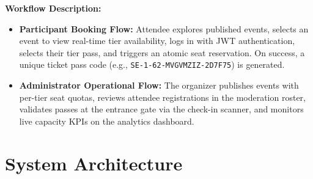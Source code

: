 \documentclass[11pt,a4paper]{article}
\begin{document}
\vspace{0.10in}
\noindent
\textbf{Workflow Description:}
\begin{itemize}[leftmargin=*]
    \item \textbf{Participant Booking Flow:} Attendee explores published events, selects an event to view real-time tier availability, logs in with JWT authentication, selects their tier pass, and triggers an atomic seat reservation. On success, a unique ticket pass code (e.g., \texttt{SE-1-62-MVGVMZIZ-2D7F75}) is generated.
    \item \textbf{Administrator Operational Flow:} The organizer publishes events with per-tier seat quotas, reviews attendee registrations in the moderation roster, validates passes at the entrance gate via the check-in scanner, and monitors live capacity KPIs on the analytics dashboard.
\end{itemize}

\newpage
\section*{{\color{TitleBlue}\bfseries
\fontsize{18}{22}\selectfont System Architecture}}

\vspace{0.10in}
\end{document}
